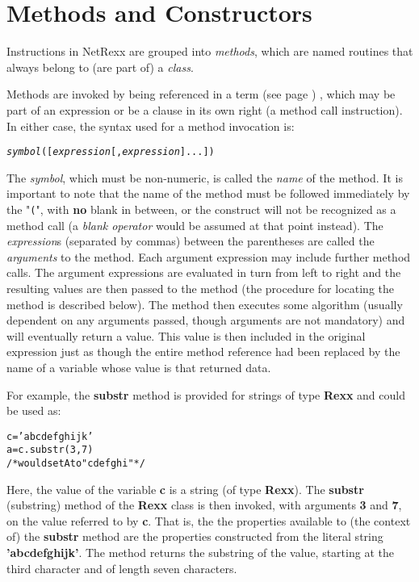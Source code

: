 \chapter{Methods and Constructors}\label{"id"}
\index{,}
 
Instructions in NetRexx are grouped into \emph{methods}, which are
named routines that always belong to (are part of) a \emph{class}.
 
Methods are invoked by being referenced in a  term (see page \pageref{refterms}) ,
which may be part of an expression or be a clause in its own right (a
method call instruction).
In either case, the syntax used for a method invocation is:
\begin{alltt}
\emph{symbol}([\emph{expression}[,\emph{expression}]...])
\end{alltt}
 The \emph{symbol}, which must be non-numeric, is called the
\emph{name} of the method.
It is important to note that the name of the method must be followed
immediately by the "\texttt{(}", with \textbf{no} blank in
between, or the construct will not be recognized as a method call
(a \emph{blank operator} would be assumed at that point instead).
 The \emph{expression}s (separated by commas) between the
parentheses are called the \emph{arguments} to the method.
Each argument expression may include further method calls.
 The argument expressions are evaluated in turn from left to right
and the resulting values are then passed to the method (the procedure
for locating the method is described below).
The method then executes some algorithm (usually dependent on any
arguments passed, though arguments are not mandatory) and will
eventually return a value.
This value is then included in the original expression just as though
the entire method reference had been replaced by the name of a variable
whose value is that returned data.
 
For example, the \textbf{substr} method is provided for strings of
type \textbf{Rexx} and could be used as:
\begin{alltt}
c='abcdefghijk'
a=c.substr(3,7)
/* would set A to "cdefghi" */
\end{alltt}
Here, the value of the variable \textbf{c} is a string (of
type \textbf{Rexx}).
The \textbf{substr} (substring) method of the \textbf{Rexx} class is
then invoked, with arguments \textbf{3} and \textbf{7}, on the value
referred to by \textbf{c}.
That is, the the properties available to (the context of)
the \textbf{substr} method are the properties constructed from the
literal string \textbf{'abcdefghijk'}.
The method returns the substring of the value, starting at the third
character and of length seven characters.
 
